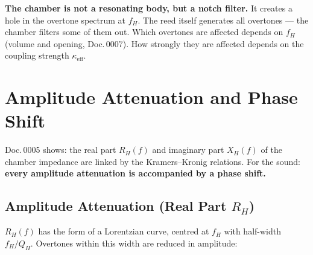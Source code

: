 \documentclass[11pt,a4paper]{article}
\begin{document}
\begin{keybox}
\textbf{The chamber is not a resonating body, but a notch filter.} It creates a hole in the overtone spectrum at $f_H$. The reed itself generates all overtones --- the chamber filters some of them out. Which overtones are affected depends on $f_H$ (volume and opening, Doc.\,0007). How strongly they are affected depends on the coupling strength $\kappa_\text{eff}$.
\end{keybox}


\section{Amplitude Attenuation and Phase Shift}

Doc.\,0005 shows: the real part $R_H(f)$ and imaginary part $X_H(f)$ of the chamber impedance are linked by the Kramers--Kronig relations. For the sound: \textbf{every amplitude attenuation is accompanied by a phase shift.}

\subsection{Amplitude Attenuation (Real Part $R_H$)}

$R_H(f)$ has the form of a Lorentzian curve, centred at $f_H$ with half-width $f_H/Q_H$. Overtones within this width are reduced in amplitude:

\begin{table}[H]
\centering\small
{}
\caption{Tonal effect of overtone attenuation by overtone order}
\end{table}
\end{document}
